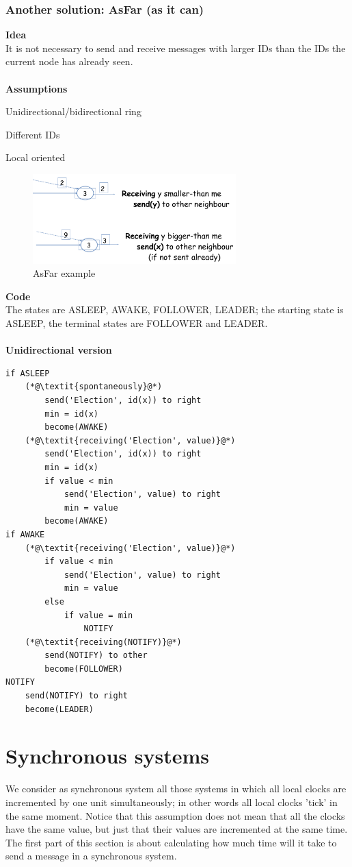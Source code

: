 \documentclass[paper=a4, fontsize=11pt]{scrartcl} %
\numberwithin{equation}{section} %
\numberwithin{figure}{section} %
\numberwithin{table}{section} %
\begin{document}
\subsubsection*{Another solution: AsFar (as it can)}
\textbf{Idea} \\ It is not necessary to send and receive messages with larger IDs than the IDs the current node has already seen.\\
~ \\ \textbf{Assumptions}
\begin{compactitem}
\item Unidirectional/bidirectional ring
\item Different IDs
\item Local oriented
\end{compactitem}
\begin{figure}[H]
  \centering
  \includegraphics[width=0.7\textwidth]{img/asfar.png}
  \caption{AsFar example}
  
\end{figure}
\textbf{Code} \\The states are ASLEEP, AWAKE, FOLLOWER, LEADER; the starting state is ASLEEP, the terminal states are FOLLOWER and LEADER.\\ \\
\textbf{Unidirectional version}
\begin{lstlisting}
if ASLEEP
	(*@\textit{spontaneously}@*)
		send('Election', id(x)) to right
		min = id(x)
		become(AWAKE)
	(*@\textit{receiving('Election', value)}@*)
		send('Election', id(x)) to right
		min = id(x)
		if value < min
			send('Election', value) to right
			min = value
		become(AWAKE)		
if AWAKE
	(*@\textit{receiving('Election', value)}@*)
		if value < min
			send('Election', value) to right
			min = value
		else
			if value = min
				NOTIFY
	(*@\textit{receiving(NOTIFY)}@*)
		send(NOTIFY) to other
		become(FOLLOWER)
NOTIFY
	send(NOTIFY) to right
	become(LEADER)						
\end{lstlisting}


\section*{Synchronous systems}
We consider as synchronous system all those systems in which all local clocks are incremented by one unit simultaneously; in other words all local clocks 'tick' in the same moment. Notice that this assumption does not mean that all the clocks have the same value, but just that their values are incremented at the same time.\\ 
The first part of this section is about calculating how much time will it take to send a message in a synchronous system.
\end{document}
